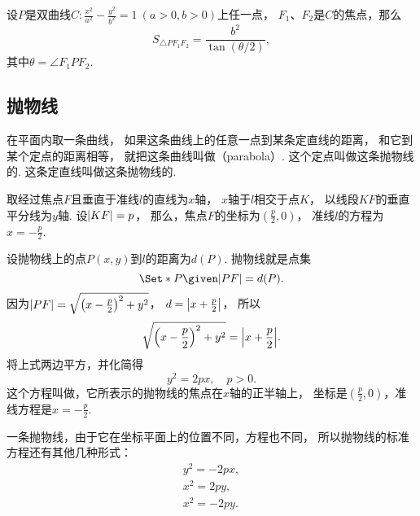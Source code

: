 \begin{theorem}[双曲线的焦点三角形]
设\(P\)是双曲线\(C: \frac{x^2}{a^2} - \frac{y^2}{b^2} = 1\ (a>0,b>0)\)上任一点，
\(F_1\)、\(F_2\)是\(C\)的焦点，那么\[
S_{\triangle P F_1 F_2} = \frac{b^2}{\tan(\theta/2)},
\]其中\(\theta=\angle{F_1 P F_2}\).
\end{theorem}

\subsection{抛物线}
在平面内取一条曲线，
如果这条曲线上的任意一点到某条定直线的距离，
和它到某个定点的距离相等，
就把这条曲线叫做（parabola）.
这个定点叫做这条抛物线的.
这条定直线叫做这条抛物线的.

取经过焦点\(F\)且垂直于准线\(l\)的直线为\(x\)轴，
\(x\)轴于\(l\)相交于点\(K\)，
以线段\(KF\)的垂直平分线为\(y\)轴.
设\(\abs{KF}=p\)，
那么，焦点\(F\)的坐标为\((\frac{p}{2},0)\)，
准线\(l\)的方程为\(x=-\frac{p}{2}\).

设抛物线上的点\(P(x,y)\)到\(l\)的距离为\(d(P)\).
抛物线就是点集\[
	\Set*{ P \given \abs{PF} = d(P) }.
\]
因为\(\abs{PF} = \sqrt{\left(x-\frac{p}{2}\right)^2+y^2}\)，
\(d = \abs{x+\frac{p}{2}}\)，
所以\[
	\sqrt{\left(x-\frac{p}{2}\right)^2+y^2} = \abs{x+\frac{p}{2}}.
\]
将上式两边平方，并化简得\begin{equation}
	y^2 = 2px, \quad p > 0.
\end{equation}
这个方程叫做，它所表示的抛物线的焦点在\(x\)轴的正半轴上，
坐标是\((\frac{p}{2},0)\)，准线方程是\(x=-\frac{p}{2}\).

一条抛物线，由于它在坐标平面上的位置不同，方程也不同，
所以抛物线的标准方程还有其他几种形式：\begin{gather}
	y^2 = -2px, \\
	x^2 = 2py, \\
	x^2 = -2py.
\end{gather}

